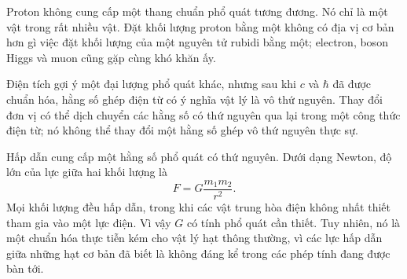 Proton không cung cấp một thang chuẩn phổ quát tương đương. Nó chỉ là một vật trong rất nhiều vật. Đặt khối lượng proton bằng một không có địa vị cơ bản hơn gì việc đặt khối lượng của một nguyên tử rubidi bằng một; electron, boson Higgs và muon cũng gặp cùng khó khăn ấy.

Điện tích gợi ý một đại lượng phổ quát khác, nhưng sau khi \(c\) và \(\hbar\) đã được chuẩn hóa, hằng số ghép điện từ có ý nghĩa vật lý là vô thứ nguyên. Thay đổi đơn vị có thể dịch chuyển các hằng số có thứ nguyên qua lại trong một công thức điện từ; nó không thể thay đổi một hằng số ghép vô thứ nguyên thực sự.

Hấp dẫn cung cấp một hằng số phổ quát có thứ nguyên. Dưới dạng Newton, độ lớn của lực giữa hai khối lượng là
\begin{equation}
F=G\frac{m_1m_2}{r^2}.
\end{equation}
Mọi khối lượng đều hấp dẫn, trong khi các vật trung hòa điện không nhất thiết tham gia vào một lực điện. Vì vậy \(G\) có tính phổ quát cần thiết. Tuy nhiên, nó là một chuẩn hóa thực tiễn kém cho vật lý hạt thông thường, vì các lực hấp dẫn giữa những hạt cơ bản đã biết là không đáng kể trong các phép tính đang được bàn tới.

\begin{classroomqa}
\end{classroomqa}

\begin{classroomqa}
\end{classroomqa}

